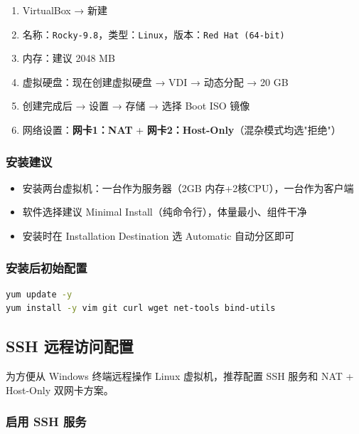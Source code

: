 \documentclass[12pt,a4paper]{ctexart}
\begin{document}
\begin{enumerate}[label=\arabic*.,leftmargin=*]
  \item VirtualBox → 新建
  \item 名称：\texttt{Rocky-9.8}，类型：\texttt{Linux}，版本：\texttt{Red Hat (64-bit)}
  \item 内存：建议 2048 MB
  \item 虚拟硬盘：现在创建虚拟硬盘 → VDI → 动态分配 → 20 GB
  \item 创建完成后 → 设置 → 存储 → 选择 Boot ISO 镜像
  \item 网络设置：\textbf{网卡1：NAT} + \textbf{网卡2：Host-Only}（混杂模式均选"拒绝"）
\end{enumerate}

\subsubsection{安装建议}

\begin{itemize}
  \item 安装两台虚拟机：一台作为服务器（2GB 内存+2核CPU），一台作为客户端
  \item 软件选择建议 Minimal Install（纯命令行），体量最小、组件干净
  \item 安装时在 Installation Destination 选 Automatic 自动分区即可
\end{itemize}

\subsubsection{安装后初始配置}

\begin{cmdbox}
\small
\begin{lstlisting}[language=bash,numbers=none]
yum update -y
yum install -y vim git curl wget net-tools bind-utils
\end{lstlisting}
\end{cmdbox}

\subsection{SSH 远程访问配置}

为方便从 Windows 终端远程操作 Linux 虚拟机，推荐配置 SSH 服务和 NAT + Host-Only 双网卡方案。

\subsubsection{启用 SSH 服务}
\end{document}
